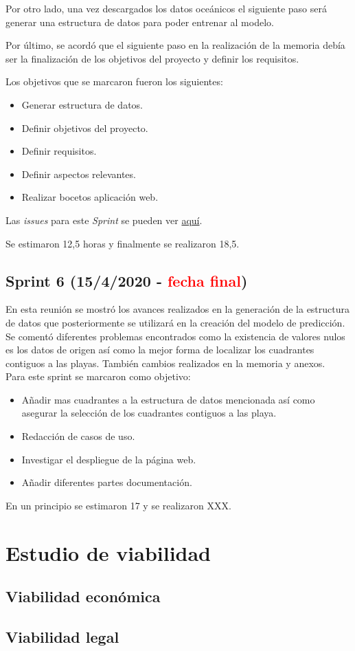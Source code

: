 Por otro lado, una vez descargados los datos oceánicos el siguiente paso será generar una estructura de datos para poder entrenar al modelo.

Por último, se acordó que el siguiente paso en la realización de la memoria debía ser la finalización de los objetivos del proyecto y definir los requisitos.

Los objetivos que se marcaron fueron los siguientes:
\begin{itemize}
	\item Generar estructura de datos.
	\item Definir objetivos del proyecto.
	\item Definir requisitos.
	\item Definir aspectos relevantes.
	\item Realizar bocetos aplicación web.
\end{itemize}

Las \emph{issues} para este \emph{Sprint} se pueden ver \href{https://github.com/psnti/TFG-Pablo-Santidrian-Tudanca/milestone/5}{aquí}.


Se estimaron 12,5 horas y finalmente se realizaron 18,5.

\subsection{Sprint 6 (15/4/2020 - \textcolor{red}{fecha final})}\label{Sprint-5}

En esta reunión se mostró los avances realizados en la generación de la estructura de datos que posteriormente se utilizará en la creación del modelo de predicción. Se comentó diferentes problemas encontrados como la existencia de valores nulos es los datos de origen así como la mejor forma de localizar los cuadrantes contiguos a las playas.
También cambios realizados en la memoria y anexos.\\
Para este sprint se marcaron como objetivo:
\begin{itemize}
	\item Añadir mas cuadrantes a la estructura de datos mencionada así como asegurar la selección de los cuadrantes contiguos a las playa.
	\item Redacción de casos de uso.
	\item Investigar el despliegue de la página web.
	\item Añadir diferentes partes  documentación.
\end{itemize} 


En un principio se estimaron 17 y se realizaron XXX.

\section{Estudio de viabilidad}

\subsection{Viabilidad económica}

\subsection{Viabilidad legal}


